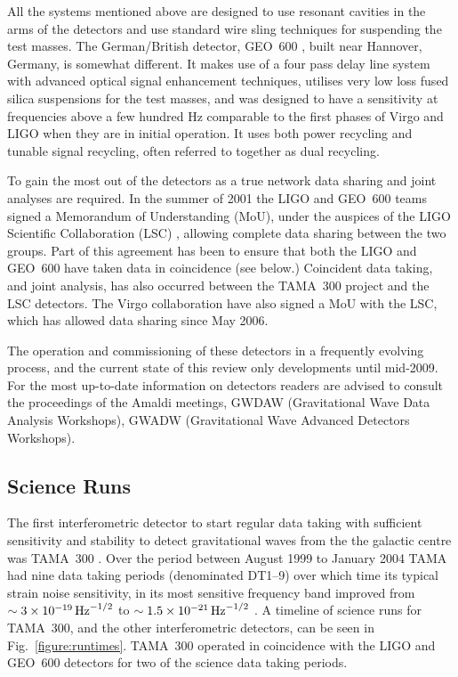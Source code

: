 \documentclass{article}
\begin{document}
All the systems mentioned above are designed to use resonant cavities in the
arms of the detectors and use standard wire sling techniques for suspending the
test masses. The German/British detector, GEO~600 \cite{GEOweb}, built near
Hannover, Germany, is somewhat different. It makes use of a four pass delay line
system with advanced optical signal enhancement techniques, utilises very low
loss fused silica suspensions for the test masses, and was designed to have a
sensitivity at frequencies above a few hundred Hz comparable to the first phases
of Virgo and LIGO when they are in initial operation. It uses both power
recycling and tunable signal recycling, often referred to together as dual
recycling.

To gain the most out of the detectors as a true network data sharing and joint
analyses are required. In the summer of 2001 the LIGO and GEO~600 teams signed a
Memorandum of Understanding (MoU), under the auspices of the LIGO Scientific
Collaboration (LSC) \cite{LSCweb}, allowing complete data sharing between the
two groups. Part of this agreement has been to ensure that both the LIGO and
GEO~600 have taken data in coincidence (see below.) Coincident data taking,
and joint analysis, has also occurred between the TAMA~300 project and the LSC
detectors. The Virgo collaboration have also signed a MoU with the LSC, which 
has allowed data sharing since May 2006.

The operation and commissioning of these detectors in a frequently evolving 
process, and the current state of this review only developments until mid-2009.
For the most up-to-date information on detectors readers are advised to consult
the proceedings of the Amaldi meetings, GWDAW (Gravitational Wave Data Analysis
Workshops), GWADW (Gravitational Wave Advanced Detectors Workshops).

\subsection{Science Runs}\label{subsection:runs}
The first interferometric detector to start regular data taking with sufficient
sensitivity and stability to detect gravitational waves from the the galactic
centre was TAMA~300 \cite{Ando:2001}. Over the period between August 1999 to
January 2004 TAMA had nine data taking periods (denominated DT1--9) over which
time its typical strain noise sensitivity, in its most sensitive frequency band
improved from $\sim3\times10^{-19}\,{\rm Hz}^{-1/2}$ to
$\sim1.5\times10^{-21}\,{\rm Hz}^{-1/2}$ \cite{Akutsu:2006}. A timeline of
science runs for TAMA~300, and the other interferometric detectors, can be
seen in Fig.~\ref{figure:runtimes}. TAMA~300 operated in coincidence with the
LIGO and GEO~600 detectors for two of the science data taking periods.
\end{document}
